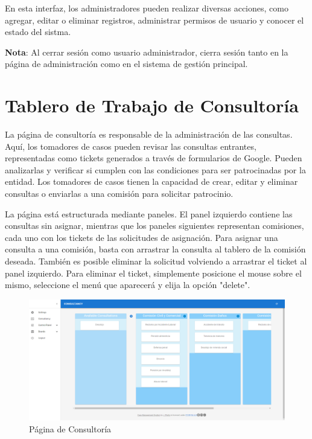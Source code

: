 En esta interfaz, los administradores pueden realizar diversas acciones, como agregar, editar o eliminar registros, administrar permisos de usuario y conocer el estado del sistma.

\textbf{Nota}: Al cerrar sesión como usuario administrador, cierra sesión tanto en la página de administración como en el sistema de gestión principal.

\section{Tablero de Trabajo de Consultoría}
La página de consultoría es responsable de la administración de las consultas. Aquí, los tomadores de casos pueden revisar las consultas entrantes, representadas como tickets generados a través de formularios de Google. Pueden analizarlas y verificar si cumplen con las condiciones para ser patrocinadas por la entidad. Los tomadores de casos tienen la capacidad de crear, editar y eliminar consultas o enviarlas a una comisión para solicitar patrocinio.

La página está estructurada mediante paneles. El panel izquierdo contiene las consultas sin asignar, mientras que los paneles siguientes representan comisiones, cada uno con los tickets de las solicitudes de asignación. Para asignar una consulta a una comisión, basta con arrastrar la consulta al tablero de la comisión deseada. También es posible eliminar la solicitud volviendo a arrastrar el ticket al panel izquierdo. Para eliminar el ticket, simplemente posicione el mouse sobre el mismo, seleccione el menú que aparecerá y elija la opción "delete".

\begin{figure}[H]
    \centering
    \includegraphics[width=1\linewidth]{fig/consultancy-real-page.png}
    \caption{Página de Consultoría}
    \label{fig:consultancy-real-page}
\end{figure}

